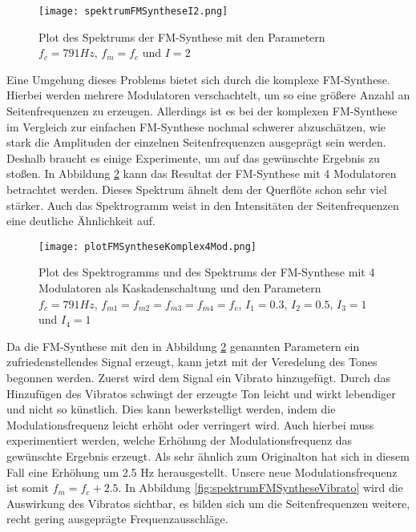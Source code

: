 \begin{figure} [ht]
\centering
  \texttt{[image: spektrumFMSyntheseI2.png]}
\caption{Plot des Spektrums der FM-Synthese mit den Parametern $f_c = 791 Hz$, $f_m = f_c$ und $I = 2$}
\label{fig:spektrumFMSyntheseI2}
\end{figure}

Eine Umgehung dieses Problems bietet sich durch die komplexe FM-Synthese. Hierbei werden mehrere Modulatoren verschachtelt, um so eine größere Anzahl an Seitenfrequenzen zu erzeugen. Allerdings ist es bei der komplexen FM-Synthese im Vergleich zur einfachen FM-Synthese nochmal schwerer abzuschätzen, wie stark die Amplituden der einzelnen Seitenfrequenzen ausgeprägt sein werden. Deshalb braucht es einige Experimente, um auf das gewünschte Ergebnis zu stoßen. In Abbildung \ref{fig:plotFMSyntheseKomplex4Mod} kann das Resultat der FM-Synthese mit 4 Modulatoren betrachtet werden. Dieses Spektrum ähnelt dem der Querflöte schon sehr viel stärker. Auch das Spektrogramm weist in den Intensitäten der Seitenfrequenzen eine deutliche Ähnlichkeit auf.

\begin{figure} [ht]
\centering
  \texttt{[image: plotFMSyntheseKomplex4Mod.png]}
\caption{Plot des Spektrogramms und des Spektrums der FM-Synthese mit 4 Modulatoren als Kaskadenschaltung und den Parametern $f_c = 791 Hz$, $f_{m1} = f_{m2} = f_{m3} = f_{m4} = f_c$, $I_1 = 0.3$, $I_2 = 0.5$, $I_3 = 1$ und $I_4 = 1$}
\label{fig:plotFMSyntheseKomplex4Mod}
\end{figure}

Da die FM-Synthese mit den in Abbildung \ref{fig:plotFMSyntheseKomplex4Mod} genannten Parametern ein zufriedenstellendes Signal erzeugt, kann jetzt mit der Veredelung des Tones begonnen werden. Zuerst wird dem Signal ein Vibrato hinzugefügt. Durch das Hinzufügen des Vibratos schwingt der erzeugte Ton leicht und wirkt lebendiger und nicht so künstlich. Dies kann bewerkstelligt werden, indem die Modulationsfrequenz leicht erhöht oder verringert wird. Auch hierbei muss experimentiert werden, welche Erhöhung der Modulationsfrequenz das gewünschte Ergebnis erzeugt. Als sehr ähnlich zum Originalton hat sich in diesem Fall eine Erhöhung um 2.5 Hz herausgestellt. Unsere neue Modulationsfrequenz ist somit $f_m = f_c + 2.5$. In Abbildung \ref{fig:spektrumFMSyntheseVibrato} wird die Auswirkung des Vibratos sichtbar, es bilden sich um die Seitenfrequenzen weitere, recht gering ausgeprägte Frequenzausschläge.

